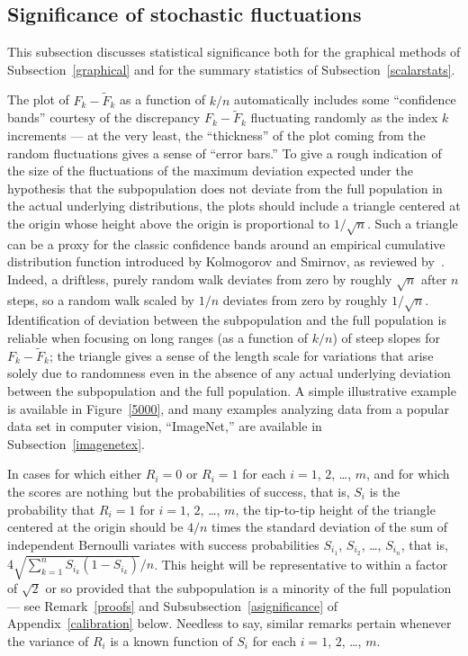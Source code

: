 \documentclass{article}
\begin{document}
\subsection{Significance of stochastic fluctuations}
\label{significance}

This subsection discusses statistical significance
both for the graphical methods of Subsection~\ref{graphical}
and for the summary statistics of Subsection~\ref{scalarstats}.

The plot of $F_k - \tilde{F}_k$ as a function of $k/n$ automatically
includes some ``confidence bands'' courtesy
of the discrepancy $F_k - \tilde{F}_k$ fluctuating randomly
as the index $k$ increments --- at the very least, the ``thickness''
of the plot coming from the random fluctuations gives a sense
of ``error bars.'' To give a rough indication of the size of the fluctuations
of the maximum deviation expected under the hypothesis that
the subpopulation does not deviate from the full population
in the actual underlying distributions, the plots should include
a triangle centered at the origin whose height above the origin
is proportional to $1/\sqrt{n}$.
Such a triangle can be a proxy for the classic confidence bands
around an empirical cumulative distribution function
introduced by Kolmogorov and Smirnov, as reviewed by~\cite{doksum}.
Indeed, a driftless, purely random walk deviates from zero
by roughly $\sqrt{n}$ after $n$ steps, so a random walk scaled by $1/n$
deviates from zero by roughly $1/\sqrt{n}$.
Identification of deviation between the subpopulation and the full population
is reliable when focusing on long ranges (as a function of $k/n$)
of steep slopes for $F_k - \tilde{F}_k$;
the triangle gives a sense of the length scale for variations
that arise solely due to randomness even in the absence
of any actual underlying deviation between the subpopulation
and the full population.
A simple illustrative example is available in Figure~\ref{5000},
and many examples analyzing data from a popular data set in computer vision,
``ImageNet,'' are available in Subsection~\ref{imagenetex}.

In cases for which either $R_i = 0$ or $R_i = 1$
for each $i = 1$, $2$, \dots, $m$,
and for which the scores are nothing but the probabilities of success,
that is, $S_i$ is the probability that $R_i = 1$ for $i = 1$, $2$, \dots, $m$,
the tip-to-tip height of the triangle centered at the origin should be
$4/n$ times the standard deviation of the sum of independent Bernoulli variates
with success probabilities $S_{i_1}$, $S_{i_2}$, \dots, $S_{i_n}$, that is,
$4 \sqrt{\sum_{k=1}^n S_{i_k} (1-S_{i_k})} / n$.
This height will be representative to within a factor of $\sqrt{2}$ or so
provided that the subpopulation is a minority of the full population ---
see Remark~\ref{proofs} and Subsubsection~\ref{asignificance}
of Appendix~\ref{calibration} below.
Needless to say, similar remarks pertain whenever the variance of $R_i$
is a known function of $S_i$ for each $i = 1$, $2$, \dots, $m$.
\end{document}
